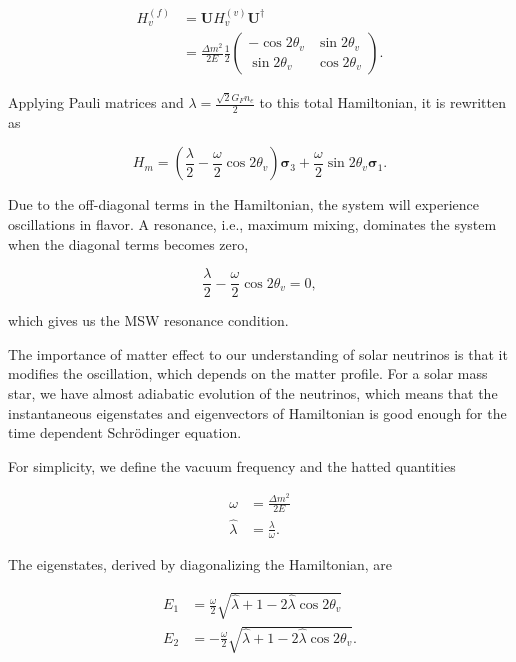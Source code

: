 \begin{align}
H_v^{(f)}& = \mathbf{U} H_v^{(v)}\mathbf{U^\dagger} \\
&= \frac{ \Delta m^2 }{2E}\frac{1}{2}\begin{pmatrix} -\cos 2\theta_v & \sin 2 \theta_v \\ \sin 2\theta_v & \cos 2\theta_v  \end{pmatrix}.
\end{align}

Applying Pauli matrices and $\lambda = \frac{\sqrt{2}G_F n_e}{2}$ to this total Hamiltonian, it is rewritten as

\begin{equation}
H_m = \left(\frac{\lambda}{2} -\frac{ \omega }{2} \cos 2\theta_v \right) \boldsymbol{\sigma}_3  + \frac{ \omega }{2} \sin 2\theta_v \boldsymbol{\sigma}_1.
\end{equation}

Due to the off-diagonal terms in the Hamiltonian, the system will experience oscillations in flavor. A resonance, i.e., maximum mixing, dominates the system when the diagonal terms becomes zero,

\begin{equation}
\frac{\lambda}{2} -\frac{ \omega }{2} \cos 2\theta_v  = 0,
\end{equation}

which gives us the MSW resonance condition.

The importance of matter effect to our understanding of solar neutrinos is that it modifies the oscillation, which depends on the matter profile. For a solar mass star, we have almost adiabatic evolution of the neutrinos, which means that the instantaneous eigenstates and eigenvectors of Hamiltonian is good enough for the time dependent Schr\"{o}dinger equation. 


For simplicity, we define the vacuum frequency and the hatted quantities

\begin{align}
\omega &= \frac{\Delta m^2}{2E} \\
\hat\lambda & = \frac{\lambda}{\omega}.
\end{align}

The eigenstates, derived by diagonalizing the Hamiltonian, are

\begin{align}
E_1 &= \frac{\omega}{2}\sqrt{ \hat\lambda +1 -  2\hat\lambda \cos 2\theta_v }\\
E_2 &= -\frac{\omega}{2}\sqrt{ \hat\lambda +1 -  2\hat\lambda \cos 2\theta_v }.
\end{align}



